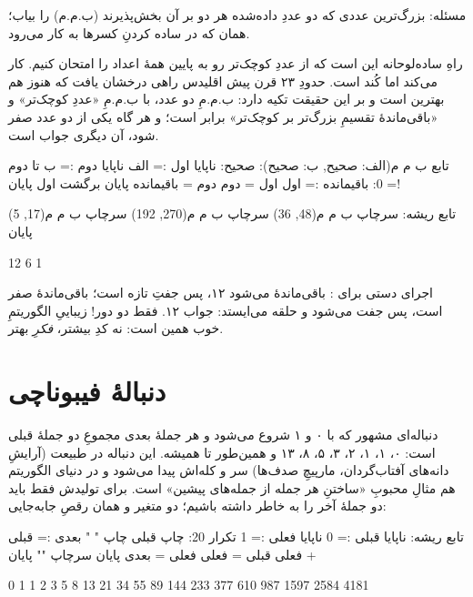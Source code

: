 مسئله: بزرگ‌ترین عددی که دو عددِ داده‌شده هر دو بر آن بخش‌پذیرند
(ب.م.م) را بیاب؛ همان که در ساده کردنِ کسرها به کار می‌رود.

راهِ ساده‌لوحانه این است که از عددِ کوچک‌تر رو به پایین همهٔ اعداد را
امتحان کنیم. کار می‌کند اما کُند است. حدودِ ۲۳ قرن پیش اقلیدس راهی
درخشان یافت که هنوز هم بهترین است و بر این حقیقت تکیه دارد: ب.م.مِ دو
عدد، با ب.م.مِ «عددِ کوچک‌تر» و «باقی‌ماندهٔ تقسیمِ بزرگ‌تر بر کوچک‌تر»
برابر است؛ و هر گاه یکی از دو عدد صفر شود، آن دیگری جواب است.

\begin{salamfa}
تابع ب م م(الف: صحیح, ب: صحیح): صحیح:
    ناپایا اول := الف
    ناپایا دوم := ب
    تا دوم != 0:
        باقیمانده := اول %
        اول = دوم
        دوم = باقیمانده
    پایان
    برگشت اول
پایان

تابع ریشه:
    سرچاپ ب م م(48, 36)
    سرچاپ ب م م(270, 192)
    سرچاپ ب م م(17, 5)
پایان
\end{salamfa}

\begin{progout}
12
6
1
\end{progout}

اجرای دستی برای : باقی‌ماندهٔ  می‌شود ۱۲،
پس جفتِ تازه  است؛ باقی‌ماندهٔ  صفر است،
پس جفت  می‌شود و حلقه می‌ایستد: جواب ۱۲. فقط دو دور! زیباییِ
الگوریتمِ خوب همین است: نه کدِ بیشتر، \emph{فکرِ} بهتر.

\section{دنبالهٔ فیبوناچی}

دنباله‌ای مشهور که با ۰ و ۱ شروع می‌شود و هر جملهٔ بعدی مجموعِ دو جملهٔ
قبلی است: ۰، ۱، ۱، ۲، ۳، ۵، ۸، ۱۳ و همین‌طور تا همیشه. این دنباله در
طبیعت (آرایشِ دانه‌های آفتاب‌گردان، مارپیچِ صدف‌ها) سر و کله‌اش پیدا
می‌شود و در دنیای الگوریتم هم مثالِ محبوبِ «ساختنِ هر جمله از جمله‌های
پیشین» است. برای تولیدش فقط باید دو جملهٔ آخر را به خاطر داشته باشیم؛
دو متغیر و همان رقصِ جابه‌جایی:

\begin{salamfa}
تابع ریشه:
    ناپایا قبلی := 0
    ناپایا فعلی := 1
    تکرار 20:
        چاپ قبلی
        چاپ " "
        بعدی := قبلی + فعلی
        قبلی = فعلی
        فعلی = بعدی
    پایان
    سرچاپ ""
پایان
\end{salamfa}

\begin{progout}
0 1 1 2 3 5 8 13 21 34 55 89 144 233 377 610 987 1597 2584 4181
\end{progout}

